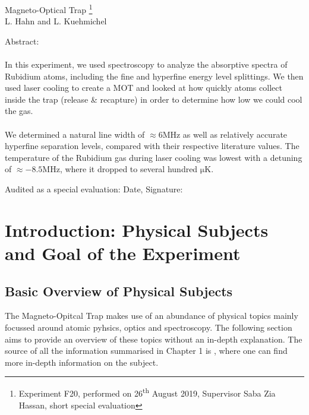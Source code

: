 \documentclass[12pt, a4paper]{article}
\begin{document}
\thispagestyle{empty}     %
\null\vspace{40mm}
\begin{center}
{%
\Large  Magneto-Optical Trap
\footnote{\noindent Experiment F20, performed on 26\textsuperscript{th} August 2019,
Supervisor Saba Zia Hassan,
short special evaluation}
}\\[15mm]
L. Hahn and L. Kuehmichel

\vspace{25mm}

\parbox{0.9\textwidth}{
Abstract:\\\\   
\small In this experiment, we used spectroscopy to analyze the absorptive spectra of Rubidium atoms, including the fine and hyperfine energy level splittings. We then used laser cooling to create a MOT and looked at how quickly atoms collect inside the trap (release \& recapture) in order to determine how low we could cool the gas.
\\\\
We determined a natural line width of $\approx 6 \si{\mega\hertz}$ as well as relatively accurate hyperfine separation levels, compared with their respective literature values. The temperature of the Rubidium gas during laser cooling was lowest with a detuning of $\approx -8.5 \si{\mega\hertz}$, where it dropped to several hundred $\si{\micro\kelvin}$.
}
\end{center}

\vfill
Audited as a special evaluation: Date, Signature:
\vspace{20mm}

\null\thispagestyle{empty} 
   

\newpage

\section{Introduction: Physical Subjects and Goal of the Experiment}
\subsection{Basic Overview of Physical Subjects}
The Magneto-Opitcal Trap makes use of an abundance of physical topics mainly focussed around atomic pyhsics, optics and spectroscopy. The following section aims to provide an overview of these topics without an in-depth explanation. The source of all the information summarised in Chapter 1 is \cite{script}, where one can find more in-depth information on the subject.
\end{document}
